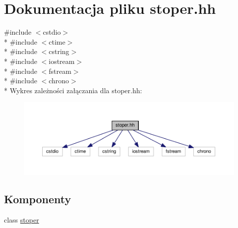 \hypertarget{stoper_8hh}{}\section{Dokumentacja pliku stoper.\+hh}
\label{stoper_8hh}
{\ttfamily \#include $<$cstdio$>$}\\*
{\ttfamily \#include $<$ctime$>$}\\*
{\ttfamily \#include $<$cstring$>$}\\*
{\ttfamily \#include $<$iostream$>$}\\*
{\ttfamily \#include $<$fstream$>$}\\*
{\ttfamily \#include $<$chrono$>$}\\*
Wykres zależności załączania dla stoper.\+hh\+:\nopagebreak
\begin{figure}[H]
\begin{center}
\leavevmode
\includegraphics[width=350pt]{stoper_8hh__incl}
\end{center}
\end{figure}
\subsection*{Komponenty}
\begin{DoxyCompactItemize}
\item 
class \hyperlink{classstoper}{stoper}
\end{DoxyCompactItemize}
